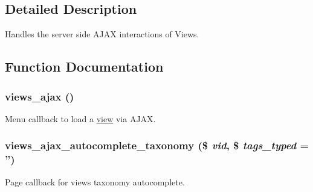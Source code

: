 \subsection{Detailed Description}
Handles the server side AJAX interactions of Views. 

\subsection{Function Documentation}
\hypertarget{group__ajax_ga5f1adff7f07ea45d8ab62b456ffdd6e0}{
\subsubsection[{views\_\-ajax}]{\setlength{\rightskip}{0pt plus 5cm}views\_\-ajax ()}}
\label{group__ajax_ga5f1adff7f07ea45d8ab62b456ffdd6e0}
Menu callback to load a \hyperlink{classview}{view} via AJAX. \hypertarget{group__ajax_ga4aed960e2ee6b6e516e609188852c0f6}{
\subsubsection[{views\_\-ajax\_\-autocomplete\_\-taxonomy}]{\setlength{\rightskip}{0pt plus 5cm}views\_\-ajax\_\-autocomplete\_\-taxonomy (\$ {\em vid}, \/  \$ {\em tags\_\-typed} = {\ttfamily ''})}}
\label{group__ajax_ga4aed960e2ee6b6e516e609188852c0f6}
Page callback for views taxonomy autocomplete.



